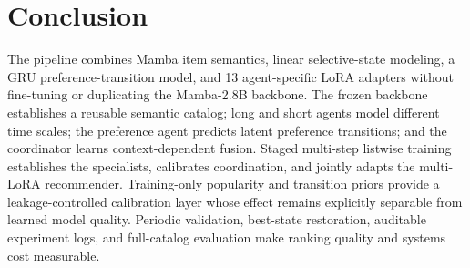 \documentclass[11pt,a4paper]{article}
\begin{document}
\section{Conclusion}

The pipeline combines Mamba item semantics, linear selective-state modeling,
a GRU preference-transition model, and 13 agent-specific LoRA adapters without
fine-tuning or duplicating the Mamba-2.8B backbone. The frozen backbone
establishes a reusable semantic catalog; long and short agents model different
time scales; the preference agent predicts latent preference transitions; and
the coordinator learns context-dependent fusion. Staged multi-step listwise
training establishes the specialists, calibrates coordination, and jointly
adapts the multi-LoRA recommender. Training-only popularity and transition priors
provide a leakage-controlled calibration layer whose effect remains explicitly
separable from learned model quality. Periodic validation, best-state
restoration, auditable experiment logs, and full-catalog evaluation make ranking
quality and systems cost measurable.
\end{document}
